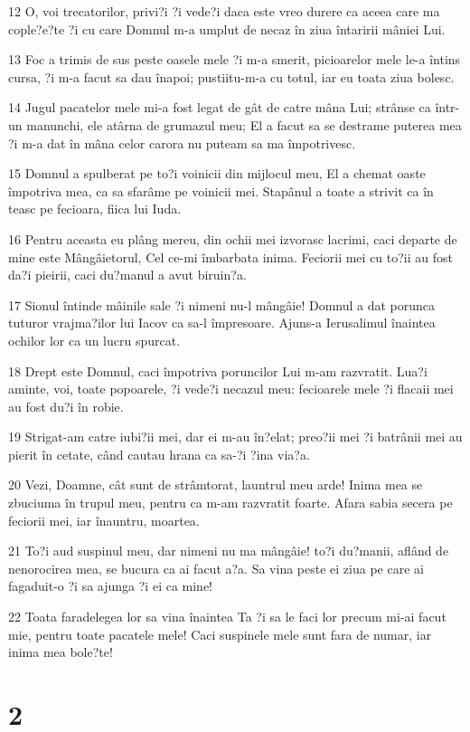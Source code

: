 \par 12 O, voi trecatorilor, privi?i ?i vede?i daca este vreo durere ca aceea care ma cople?e?te ?i cu care Domnul m-a umplut de necaz în ziua întaririi mâniei Lui.
\par 13 Foc a trimis de sus peste oasele mele ?i m-a smerit, picioarelor mele le-a întins cursa, ?i m-a facut sa dau înapoi; pustiitu-m-a cu totul, iar eu toata ziua bolesc.
\par 14 Jugul pacatelor mele mi-a fost legat de gât de catre mâna Lui; strânse ca într-un manunchi, ele atârna de grumazul meu; El a facut sa se destrame puterea mea ?i m-a dat în mâna celor carora nu puteam sa ma împotrivesc.
\par 15 Domnul a spulberat pe to?i voinicii din mijlocul meu, El a chemat oaste împotriva mea, ca sa sfarâme pe voinicii mei. Stapânul a toate a strivit ca în teasc pe fecioara, fiica lui Iuda.
\par 16 Pentru aceasta eu plâng mereu, din ochii mei izvorasc lacrimi, caci departe de mine este Mângâietorul, Cel ce-mi îmbarbata inima. Feciorii mei cu to?ii au fost da?i pieirii, caci du?manul a avut biruin?a.
\par 17 Sionul întinde mâinile sale ?i nimeni nu-l mângâie! Domnul a dat porunca tuturor vrajma?ilor lui Iacov ca sa-l împresoare. Ajuns-a Ierusalimul înaintea ochilor lor ca un lucru spurcat.
\par 18 Drept este Domnul, caci împotriva poruncilor Lui m-am razvratit. Lua?i aminte, voi, toate popoarele, ?i vede?i necazul meu: fecioarele mele ?i flacaii mei au fost du?i în robie.
\par 19 Strigat-am catre iubi?ii mei, dar ei m-au în?elat; preo?ii mei ?i batrânii mei au pierit în cetate, când cautau hrana ca sa-?i ?ina via?a.
\par 20 Vezi, Doamne, cât sunt de strâmtorat, launtrul meu arde! Inima mea se zbuciuma în trupul meu, pentru ca m-am razvratit foarte. Afara sabia secera pe feciorii mei, iar înauntru, moartea.
\par 21 To?i aud suspinul meu, dar nimeni nu ma mângâie! to?i du?manii, aflând de nenorocirea mea, se bucura ca ai facut a?a. Sa vina peste ei ziua pe care ai fagaduit-o ?i sa ajunga ?i ei ca mine!
\par 22 Toata faradelegea lor sa vina înaintea Ta ?i sa le faci lor precum mi-ai facut mie, pentru toate pacatele mele! Caci suspinele mele sunt fara de numar, iar inima mea bole?te!

\chapter{2}

